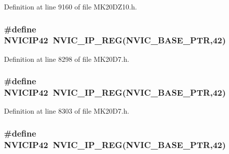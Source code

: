 Definition at line 9160 of file M\+K20\+D\+Z10.\+h.

\subsubsection[{\texorpdfstring{N\+V\+I\+C\+I\+P42}{NVICIP42}}]{\setlength{\rightskip}{0pt plus 5cm}\#define N\+V\+I\+C\+I\+P42~{\bf N\+V\+I\+C\+\_\+\+I\+P\+\_\+\+R\+EG}({\bf N\+V\+I\+C\+\_\+\+B\+A\+S\+E\+\_\+\+P\+TR},42)}\hypertarget{group___n_v_i_c___register___accessor___macros_gafa1f3c93bd4e8cfd880770513c78975e}{}\label{group___n_v_i_c___register___accessor___macros_gafa1f3c93bd4e8cfd880770513c78975e}


Definition at line 8298 of file M\+K20\+D7.\+h.

\subsubsection[{\texorpdfstring{N\+V\+I\+C\+I\+P42}{NVICIP42}}]{\setlength{\rightskip}{0pt plus 5cm}\#define N\+V\+I\+C\+I\+P42~{\bf N\+V\+I\+C\+\_\+\+I\+P\+\_\+\+R\+EG}({\bf N\+V\+I\+C\+\_\+\+B\+A\+S\+E\+\_\+\+P\+TR},42)}\hypertarget{group___n_v_i_c___register___accessor___macros_gafa1f3c93bd4e8cfd880770513c78975e}{}\label{group___n_v_i_c___register___accessor___macros_gafa1f3c93bd4e8cfd880770513c78975e}


Definition at line 8303 of file M\+K20\+D7.\+h.

\subsubsection[{\texorpdfstring{N\+V\+I\+C\+I\+P42}{NVICIP42}}]{\setlength{\rightskip}{0pt plus 5cm}\#define N\+V\+I\+C\+I\+P42~{\bf N\+V\+I\+C\+\_\+\+I\+P\+\_\+\+R\+EG}({\bf N\+V\+I\+C\+\_\+\+B\+A\+S\+E\+\_\+\+P\+TR},42)}\hypertarget{group___n_v_i_c___register___accessor___macros_gafa1f3c93bd4e8cfd880770513c78975e}{}\label{group___n_v_i_c___register___accessor___macros_gafa1f3c93bd4e8cfd880770513c78975e}


